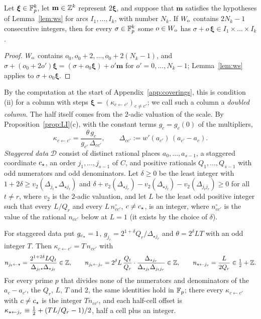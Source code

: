 \begin{lemma}[Doubling]\label{lem:D}
Let $\boldsymbol\xi\in\mathbb{F}_p^k$, let $\mathbf m\in\mathbb{Z}^k$ represent $2\boldsymbol\xi$, and suppose that $\mathbf m$ satisfies the hypotheses of Lemma~\ref{lem:ws} for arcs $I_1,\dots,I_k$, with number $N_k$. If $W_{\mathrm o}$ contains $2N_k-1$ consecutive integers, then for every $\sigma\in\mathbb{F}_p^k$ some $o\in W_{\mathrm o}$ has $\sigma+o\,\boldsymbol\xi\in I_1\times\dots\times I_k$.
\end{lemma}

\begin{proof}
$W_{\mathrm o}$ contains $o_0,o_0+2,\dots,o_0+2(N_k-1)$, and $\sigma+(o_0+2o')\boldsymbol\xi=(\sigma+o_0\boldsymbol\xi)+o'\mathbf m$ for $o'=0,\dots,N_k-1$; Lemma~\ref{lem:ws} applies to $\sigma+o_0\boldsymbol\xi$.
\end{proof}

By the computation at the start of Appendix~\ref{app:coverings}, this is condition (ii) for a column with steps $\boldsymbol\xi=(\kappa_{c\leftarrow c'})_{c\ne c'}$; we call such a column a \emph{doubled column}. The half itself comes from the $2$-adic valuation of the scale. By Proposition~\ref{prop:LI}(c), with the constant terms $g_c=g_c(0)$ of the multipliers,
\[
\kappa_{c\leftarrow c'}=\frac{\theta\,g_c}{g_{c'}\,\Delta_{cc'}},\qquad \Delta_{cc'}:=w'(a_{c'})\,(a_{c'}-a_c).
\]
\emph{Staggered data} $\mathcal D$ consist of distinct rational places $a_0,\dots,a_{s-1}$, a staggered coordinate $c_{\star}$, an order $j_1,\dots,j_{s-1}$ of $C$, and positive rationals $Q_1,\dots,Q_{s-1}$ with odd numerators and odd denominators. Let $\delta\ge0$ be the least integer with $1+2\delta\ge v_2(\Delta_{j_t\star}\Delta_{\star j_t})$ and $\delta+v_2(\Delta_{\star j_r})-v_2(\Delta_{\star j_t})-v_2(\Delta_{j_tj_r})\ge0$ for all $t\ne r$, where $v_2$ is the $2$-adic valuation, and let $L$ be the least odd positive integer such that every $L/Q_r$ and every $L\,n^\circ_{cc'}$, $c\ne c_{\star}$, is an integer, where $n^\circ_{cc'}$ is the value of the rational $n_{cc'}$ below at $L=1$ (it exists by the choice of $\delta$).

\begin{lemma}\label{lem:R}
For staggered data put $g_{c_{\star}}=1$, $g_{j_r}=2^{1+\delta}Q_r/\Delta_{\star j_r}$ and $\theta=2^\delta LT$ with an odd integer $T$. Then $\kappa_{c\leftarrow c'}=T\,n_{cc'}$ with
\[
n_{j_t\leftarrow\star}=\frac{2^{1+2\delta}LQ_t}{\Delta_{j_t\star}\Delta_{\star j_t}}\in\mathbb{Z},\qquad n_{j_t\leftarrow j_r}=2^\delta L\,\frac{Q_t}{Q_r}\cdot\frac{\Delta_{\star j_r}}{\Delta_{\star j_t}\Delta_{j_tj_r}}\in\mathbb{Z},\qquad n_{\star\leftarrow j_r}=\frac{L}{2Q_r}\in\tfrac12+\mathbb{Z} .
\]
For every prime $p$ that divides none of the numerators and denominators of the $a_c-a_{c'}$, the $Q_r$, $L$, $T$ and $2$, the same identities hold in $\mathbb{F}_p$; there every $\kappa_{c\leftarrow c'}$ with $c\ne c_{\star}$ is the integer $Tn_{cc'}$, and each half-cell offset is $\kappa_{\star\leftarrow j_r}\equiv\tfrac12+(TL/Q_r-1)/2$, half a cell plus an integer.
\end{lemma}

